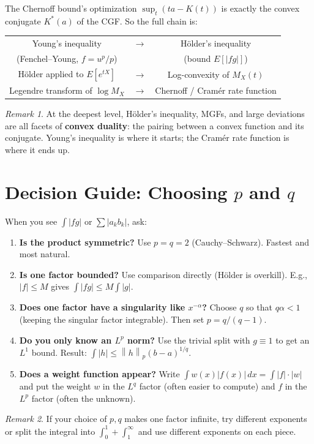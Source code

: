\documentclass[11pt]{article}
\newcommand{\norm}[2]{\left\|#1\right\|_{#2}}
\theoremstyle{myplain}
\theoremstyle{definition}
\theoremstyle{remark}
\newtheorem*{remark}{Remark}
\begin{document}
The Chernoff bound's optimization $\sup_t(ta - K(t))$ is exactly the convex conjugate $K^*(a)$ of the CGF. So the full chain is:

\begin{center}
\renewcommand{\arraystretch}{1.4}
\begin{tabular}{ccc}
  Young's inequality & $\longrightarrow$ & Hölder's inequality \\
  (Fenchel--Young, $f = u^p/p$) & & (bound $E[|fg|]$) \\[4pt]
  Hölder applied to $E[e^{tX}]$ & $\longrightarrow$ & Log-convexity of $M_X(t)$ \\[4pt]
  Legendre transform of $\log M_X$ & $\longrightarrow$ & Chernoff / Cramér rate function \\
\end{tabular}
\end{center}

\begin{remark}
At the deepest level, Hölder's inequality, MGFs, and large deviations are all facets of \textbf{convex duality}: the pairing between a convex function and its conjugate. Young's inequality is where it starts; the Cramér rate function is where it ends up.
\end{remark}

\section{Decision Guide: Choosing $p$ and $q$}

When you see $\int |fg|$ or $\sum |a_kb_k|$, ask:

\begin{enumerate}[leftmargin=*, itemsep=4pt]
  \item \textbf{Is the product symmetric?} Use $p = q = 2$ (Cauchy--Schwarz). Fastest and most natural.

  \item \textbf{Is one factor bounded?} Use comparison directly (H\"{o}lder is overkill). E.g., $|f| \leq M$ gives $\int |fg| \leq M\int|g|$.

  \item \textbf{Does one factor have a singularity like $x^{-\alpha}$?} Choose $q$ so that $q\alpha < 1$ (keeping the singular factor integrable). Then set $p = q/(q-1)$.

  \item \textbf{Do you only know an $L^p$ norm?} Use the trivial split with $g \equiv 1$ to get an $L^1$ bound. Result: $\int|h| \leq \norm{h}{p}(b-a)^{1/q}$.

  \item \textbf{Does a weight function appear?} Write $\int w(x)|f(x)|\,dx = \int |f| \cdot |w|$ and put the weight $w$ in the $L^q$ factor (often easier to compute) and $f$ in the $L^p$ factor (often the unknown).
\end{enumerate}

\begin{remark}
If your choice of $p,q$ makes one factor infinite, try different exponents or split the integral into $\int_0^1 + \int_1^\infty$ and use different exponents on each piece.
\end{remark}
\end{document}
